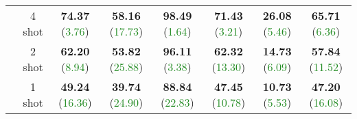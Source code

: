 \documentclass[10pt,journal,letterpaper,compsoc]{IEEEtran}
\begin{document}
\begin{table*}[h]
{{{\begin{tabular}{@{}cc|cccccc@{}}
        & 4 shot  & \textbf{74.37} (\textcolor{forestgreen}{3.76}) & \textbf{58.16} (\textcolor{forestgreen}{17.73}) & \textbf{98.49} (\textcolor{forestgreen}{1.64}) & \textbf{71.43} (\textcolor{forestgreen}{3.21}) & \textbf{26.08} (\textcolor{forestgreen}{5.46}) & \textbf{65.71} (\textcolor{forestgreen}{6.36}) \\
        & 2 shot  & \textbf{62.20} (\textcolor{forestgreen}{8.94}) & \textbf{53.82} (\textcolor{forestgreen}{25.88}) & \textbf{96.11} (\textcolor{forestgreen}{3.38}) & \textbf{62.32} (\textcolor{forestgreen}{13.30}) & \textbf{14.73} (\textcolor{forestgreen}{6.09}) & \textbf{57.84} (\textcolor{forestgreen}{11.52}) \\
        & 1 shot  & \textbf{49.24} (\textcolor{forestgreen}{16.36}) & \textbf{39.74} (\textcolor{forestgreen}{24.90}) & \textbf{88.84} (\textcolor{forestgreen}{22.83}) & \textbf{47.45} (\textcolor{forestgreen}{10.78}) & \textbf{10.73} (\textcolor{forestgreen}{5.53}) & \textbf{47.20} (\textcolor{forestgreen}{16.08}) \\ \bottomrule
    \end{tabular}
    }}}
\end{table*}
\end{document}
